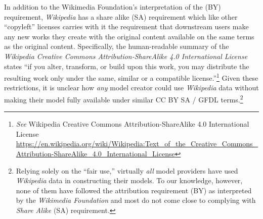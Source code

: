 In addition to the Wikimedia Foundation's interpretation of the (BY) requirement, \textit{Wikipedia} has a share alike (SA) requirement which like other ``copyleft'' licenses carries with it the requirement that downstream users make any new works they create with the original content available on the same terms as the original content.\cite{carver2005share}\cite{lessig2004creative} Specifically, the human-readable summary of the \textit{Wikipedia Creative Commons Attribution-ShareAlike 4.0 International License} states ``if you alter, transform, or build upon this work, you may distribute the resulting work only under the same, similar or a compatible license.''\footnote{\textit{See} Wikipedia Creative Commons Attribution-ShareAlike 4.0 International License \url{https://en.wikipedia.org/wiki/Wikipedia:Text_of_the_Creative_Commons_Attribution-ShareAlike_4.0_International_License}} Given these restrictions, it is unclear how \textit{any} model creator could use \textit{Wikipedia} data without making their model fully available under similar CC BY SA / GFDL terms.\footnote{Relying solely on the ``fair use,'' virtually \textit{all} model providers have used \textit{Wikipedia} data in constructing their models. To our knowledge, however, none of them have followed the attribution requirement (BY) as interpreted by the \textit{Wikimedia Foundation} and most do not come close to complying with \textit{Share Alike} (SA) requirement.}  






